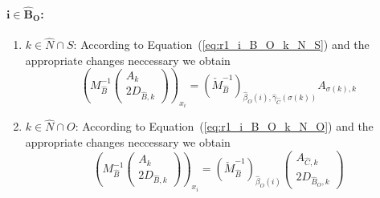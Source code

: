 \documentclass[a4paper]{article}
\begin{document}
\paragraph{$\mathbf{i \in \hat{B}_{O}}$:}
\begin{enumerate}
\item $k \in \hat{N} \cap S$:
According to Equation~(\ref{eq:r1_i_B_O_k_N_S}) and the appropriate changes
neccessary we obtain
\begin{equation}
\label{eq:r2_i_B_O_k_N_S}
\left(
  M_{\hat{B}}^{-1}
  \left(\begin{array}{c}
          A_{k} \\
	  \hline
	  2D_{\hat{B}, k}
	\end{array}
  \right)
\right)_{x_{i}}
=
\left(\check{M}_{\hat{B}}^{-1}\right)_{\hat{\beta}_{O}(i),
\hat{\gamma}_{\hat{C}}(\sigma(k))}
A_{\sigma(k), k}
\end{equation}
\item $k \in \hat{N} \cap O$:
According to Equation~(\ref{eq:r1_i_B_O_k_N_O}) and the appropriate changes
neccessary we obtain
\begin{equation}
\label{eq:r2_i_B_O_k_N_O}
\left(
  M_{\hat{B}}^{-1}
  \left(\begin{array}{c}
          A_{k} \\
	  \hline
	  2D_{\hat{B}, k}
	\end{array}
  \right)
\right)_{x_{i}}
=
\left(\check{M}_{\hat{B}}^{-1}\right)_{\hat{\beta}_{O}(i)}
\left(\begin{array}{c}
        A_{\hat{C}, k} \\
	\hline
	2D_{\hat{B}_{O}, k}
      \end{array}
\right)
\end{equation}
\end{enumerate}
\end{document}
